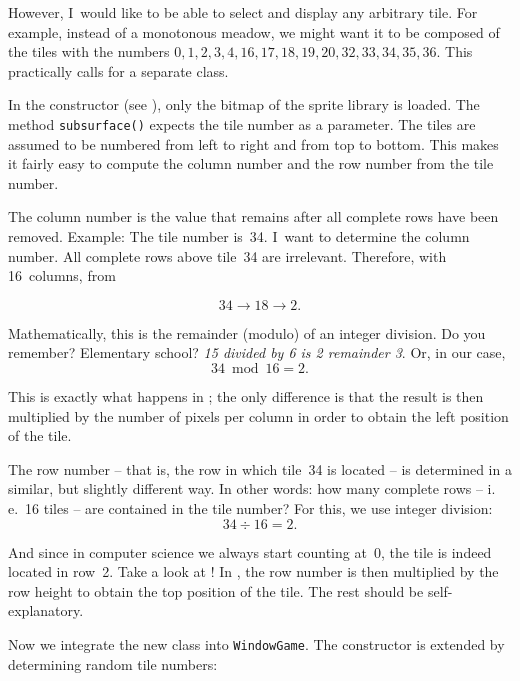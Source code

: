 \newpage
{}

However, I~would like to be able to select and display any arbitrary tile. For example, instead of a monotonous meadow, we might want it to be composed of the tiles with the numbers $0, 1, 2, 3, 4, 16, 17, 18, 19, 20, 32, 33, 34, 35, 36$. This practically calls for a separate class.

In the constructor (see ), only the bitmap of the sprite library is loaded. The method \texttt{sub\-sur\-face()} expects the tile number as a parameter.  The tiles are assumed to be numbered from left to right and from top to bottom. This makes it fairly easy to compute the column number and the row number from the tile number.

The column number is the value that remains after all complete rows have been removed. Example: The tile number is~34. I~want to determine the column number. All complete rows above tile~34 are irrelevant. Therefore, with 16~columns, from

\[34 \rightarrow 18 \rightarrow 2.\]

Mathematically, this is the remainder (\gls{modulo}) of an integer division. Do you remember? Elementary school? \emph{15 divided by 6 is 2 remainder 3}.  Or, in our case,
\[34 \bmod 16 = 2.\]

This is exactly what happens in ; the only difference is that the result is then multiplied by the number of pixels per column in order to obtain the left position of the tile.

The row number -- that is, the row in which tile~34 is located -- is determined in a similar, but slightly different way. In other words: how many complete rows -- i.\,e.\ 16 tiles -- are contained in the tile number? For this, we use integer division:
\[34 \div 16 = 2.\]

And since in computer science we always start counting at~0, the tile is indeed located in row~2. Take a look at ! In , the row number is then multiplied by the row height to obtain the top position of the tile.  The rest should be self-explanatory.


Now we integrate the new class into \texttt{WindowGame}. The constructor is extended by determining random tile numbers:

